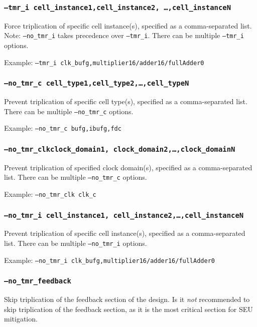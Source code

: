 \subsubsection{\texttt{--tmr\_i cell\_instance1,cell\_instance2,
\ldots,cell\_instanceN}}
Force triplication of specific cell instance(s), specified as a comma-separated
list. 
Note: \texttt{--no\_tmr\_i} takes precedence over \texttt{--tmr\_i}. There can be
multiple \texttt{--tmr\_i} options.
 
Example: \texttt{--tmr\_i clk\_bufg,multiplier16/adder16/fullAdder0}

\subsubsection{\texttt{--no\_tmr\_c cell\_type1,cell\_type2,\ldots,cell\_typeN}}
Prevent triplication of specific cell type(s), specified as a comma-separated 
list. There can be multiple \texttt{--no\_tmr\_c} options.

Example: \texttt{--no\_tmr\_c bufg,ibufg,fdc}

\subsubsection{\texttt{--no\_tmr\_clkclock\_domain1,
clock\_domain2,\ldots,clock\_domainN}}
Prevent triplication of specified clock domain(s), specified as a comma-separated 
list. There can be multiple \texttt{--no\_tmr\_c} options.

Example: \texttt{--no\_tmr\_clk clk\_c}


\subsubsection{\texttt{--no\_tmr\_i cell\_instance1,
cell\_instance2,\ldots,cell\_instanceN}}
Prevent triplication of specific cell instance(s), specified as a 
comma-separated list. There can be multiple \texttt{--no\_tmr\_i} options.

Example: \texttt{--no\_tmr\_i clk\_bufg,multiplier16/adder16/fullAdder0}

\subsubsection{\texttt{--no\_tmr\_feedback}}
Skip triplication of the feedback section of the design. 
Is it \emph{not} recommended to skip triplication of the feedback section, as 
it is the most critical section for SEU mitigation.


